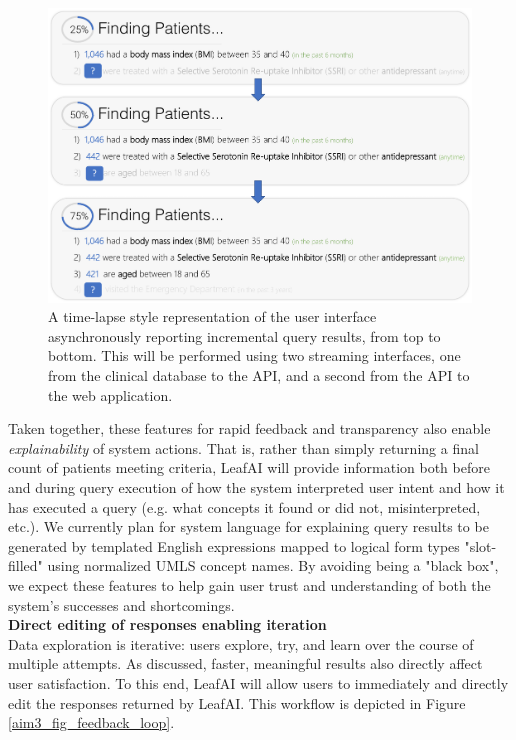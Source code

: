 \documentclass[../main.tex]{subfiles}
\begin{document}
\begin{figure}[h!]
  \centering
  \includegraphics[scale=0.5]{Figures/Aim3/aim3_query_progress.pdf}  
  \caption{A time-lapse style representation of the user interface asynchronously reporting incremental query results, from top to bottom. This will be performed using two streaming interfaces, one from the clinical database to the API, and a second from the API to the web application.}
\label{aim3_fig_query_progress}
\end{figure}

Taken together, these features for rapid feedback and transparency also enable \textit{explainability} of system actions. That is, rather than simply returning a final count of patients meeting criteria, LeafAI will provide information both before and during query execution of how the system interpreted user intent and how it has executed a query (e.g. what concepts it found or did not, misinterpreted, etc.). We currently plan for system language for explaining query results to be generated by templated English expressions mapped to logical form types "slot-filled" using normalized UMLS concept names. By avoiding being a "black box", we expect these features to help gain user trust and understanding of both the system's successes and shortcomings. \\

\noindent \textbf{Direct editing of responses enabling iteration} \\
Data exploration is iterative: users explore, try, and learn over the course of multiple attempts. As discussed, faster, meaningful results also directly affect user satisfaction. To this end, LeafAI will allow users to immediately and directly edit the responses returned by LeafAI. This workflow is depicted in Figure \ref{aim3_fig_feedback_loop}. 
\end{document}
